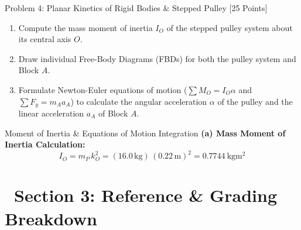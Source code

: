 \documentclass[11pt, a4paper, titlepage=false]{scrartcl}
\begin{document}
\begin{problembox}{Problem 4: Planar Kinetics of Rigid Bodies \& Stepped Pulley \hfill [25 Points]}
\begin{center}
        \label{fig:pulley_diagram}
    \end{center}

    \begin{enumerate}[label=\alph*\lbrack\arabic*\rbrack, leftmargin=*, font=\bfseries\color{SecondaryTeal}]
        \item Compute the mass moment of inertia $I_O$ of the stepped pulley system about its central axis $O$.
        \item Draw individual Free-Body Diagrams (FBDs) for both the pulley system and Block $A$.
        \item Formulate Newton-Euler equations of motion ($\sum M_O = I_O \alpha$ and $\sum F_y = m_A a_A$) to calculate the angular acceleration $\alpha$ of the pulley and the linear acceleration $a_A$ of Block $A$.
    \end{enumerate}
\end{problembox}

\begin{solutionworkspace}{Moment of Inertia \& Equations of Motion Integration}
    \textbf{(a) Mass Moment of Inertia Calculation:}
    \[
        I_O = m_P \, k_O^2 = (16.0 \, \text{kg}) \, (0.22 \, \text{m})^2 = \SI{0.7744}{\kilogram\meter\squared}
    \]

    \vspace{4.0cm}
\end{solutionworkspace}

\newpage
\section*{\textcolor{PrimaryDark}{\faBook\ Section 3: Reference \& Grading Breakdown}}
\end{document}
